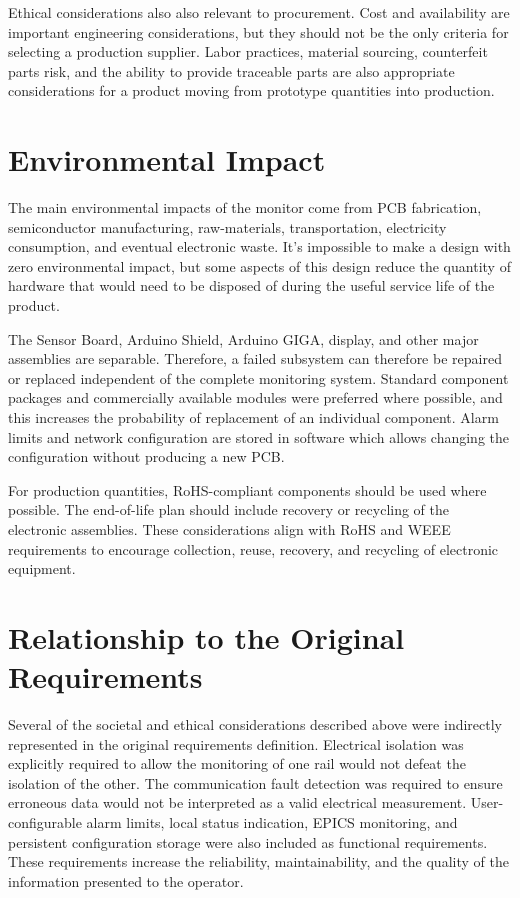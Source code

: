 Ethical considerations also also relevant to procurement. Cost and availability are important engineering considerations, but they should not be the only criteria for selecting a production supplier. Labor practices, material sourcing, counterfeit parts risk, and the ability to provide traceable parts are also appropriate considerations for a product moving from prototype quantities into
production.

\section{Environmental Impact}

The main environmental impacts of the monitor come from PCB fabrication,
semiconductor manufacturing, raw-materials, transportation, electricity consumption, and eventual electronic waste. It's impossible to make a design with zero environmental impact, but some aspects of this design reduce the quantity of hardware that would need to be disposed of during the useful service life of the product.

The Sensor Board, Arduino Shield, Arduino GIGA, display, and other major
assemblies are separable. Therefore, a failed subsystem can therefore be repaired or replaced independent of the complete monitoring system. Standard component
packages and commercially available modules were preferred where possible, and this increases the probability of replacement of an individual component. Alarm limits and network configuration are stored in software which allows changing the configuration without producing a new PCB.

For production quantities, RoHS-compliant
components should be used where possible. The end-of-life plan should include recovery or recycling of the electronic assemblies. These considerations align with RoHS and WEEE requirements to
encourage collection, reuse, recovery, and recycling of electronic equipment.

\section{Relationship to the Original Requirements}

Several of the societal and ethical considerations described above were indirectly represented in the original requirements definition. Electrical
isolation was explicitly required to allow the monitoring of one rail would not defeat the isolation of the other. The communication fault detection was required to ensure erroneous data would not be interpreted as a valid electrical measurement. User-configurable alarm limits, local status indication, EPICS monitoring, and
persistent configuration storage were also included as functional requirements. These requirements increase the reliability, maintainability, and the quality of the
information presented to the operator.

